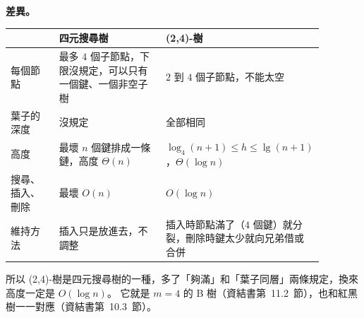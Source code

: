 \begin{pastsoln}
\textbf{差異。}
\begin{center}
\small
\begin{tabular}{p{0.16\linewidth}p{0.36\linewidth}p{0.36\linewidth}}
\toprule
 & 四元搜尋樹 & (2,4)-樹 \\
\midrule
每個節點 & 最多 $4$ 個子節點，下限沒規定，可以只有一個鍵、一個非空子樹 & $2$ 到 $4$ 個子節點，不能太空 \\
葉子的深度 & 沒規定 & 全部相同 \\
高度 & 最壞 $n$ 個鍵排成一條鏈，高度 $\Theta(n)$ & $\log_4(n+1) \le h \le \lg(n+1)$，$\Theta(\log n)$ \\
搜尋、插入、刪除 & 最壞 $O(n)$ & $O(\log n)$ \\
維持方法 & 插入只是放進去，不調整 & 插入時節點滿了（$4$ 個鍵）就分裂，刪除時鍵太少就向兄弟借或合併 \\
\bottomrule
\end{tabular}
\end{center}
所以 (2,4)-樹是四元搜尋樹的一種，多了「夠滿」和「葉子同層」兩條規定，換來高度一定是 $O(\log n)$。 它就是 $m = 4$
的 B 樹（資結書第~11.2~節），也和紅黑樹一一對應（資結書第~10.3~節）。
\end{pastsoln}
